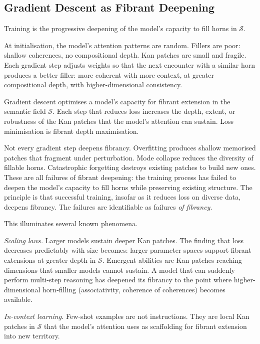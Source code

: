 \subsection{Gradient Descent as Fibrant Deepening}

Training is the progressive deepening of the model's capacity to fill horns in $\mathcal{S}$.

At initialisation, the model's attention patterns are random. Fillers are poor: shallow coherences, no compositional depth. Kan patches are small and fragile. Each gradient step adjusts weights so that the next encounter with a similar horn produces a better filler: more coherent with more context, at greater compositional depth, with higher-dimensional consistency.

\begin{principle}
\label{princ:training}
Gradient descent optimises a model's capacity for fibrant extension in the semantic field $\mathcal{S}$. Each step that reduces loss increases the depth, extent, or robustness of the Kan patches that the model's attention can sustain. Loss minimisation is fibrant depth maximisation.
\end{principle}

Not every gradient step deepens fibrancy. Overfitting produces shallow memorised patches that fragment under perturbation. Mode collapse reduces the diversity of fillable horns. Catastrophic forgetting destroys existing patches to build new ones. These are all failures of fibrant deepening: the training process has failed to deepen the model's capacity to fill horns while preserving existing structure. The principle is that successful training, insofar as it reduces loss on diverse data, deepens fibrancy. The failures are identifiable as failures \emph{of fibrancy}.

This illuminates several known phenomena.

\emph{Scaling laws.} Larger models sustain deeper Kan patches. The finding that loss decreases predictably with size \cite{kaplan2020scaling} becomes: larger parameter spaces support fibrant extensions at greater depth in $\mathcal{S}$. Emergent abilities \cite{wei2022emergent} are Kan patches reaching dimensions that smaller models cannot sustain. A model that can suddenly perform multi-step reasoning has deepened its fibrancy to the point where higher-dimensional horn-filling (associativity, coherence of coherences) becomes available.

\emph{In-context learning.} Few-shot examples are not instructions. They are local Kan patches in $\mathcal{S}$ that the model's attention uses as scaffolding for fibrant extension into new territory.

